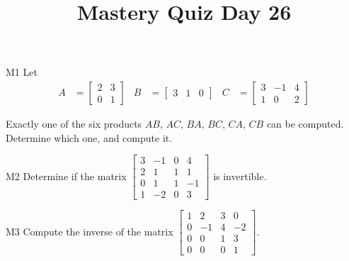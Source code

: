 \documentclass{sbgLAquiz}
\title{Mastery Quiz Day 26 }
\begin{document}
\begin{problem}{M1}
Let
\begin{align*}
A &= \begin{bmatrix} 2 & 3 \\ 0 & 1 \end{bmatrix} & B&= \begin{bmatrix} 3 & 1 & 0 \end{bmatrix} & C&= \begin{bmatrix} 3 & -1 & 4 \\ 1 & 0 & 2 \end{bmatrix}
\end{align*}

Exactly one of the six products $AB$, $AC$, $BA$, $BC$, $CA$, $CB$ can be computed.  Determine which one, and compute it.
\end{problem}

\begin{problem}{M2}
Determine if the matrix $\begin{bmatrix} 3 & -1 & 0 & 4 \\ 2 & 1 & 1 & 1 \\ 0 & 1 & 1 & -1 \\ 1 & -2 & 0 & 3 \end{bmatrix}$ is invertible.
\end{problem}
\newpage

\begin{problem}{M3}
Compute the inverse of the matrix $\begin{bmatrix} 1 & 2 & 3 & 0 \\ 0 & -1 & 4 & -2 \\ 0 & 0 & 1 & 3 \\ 0 & 0 & 0 & 1 \end{bmatrix}$.
\end{problem}
\end{document}
